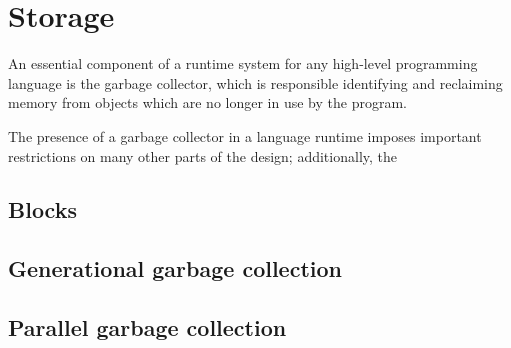 \section{Storage}

An essential component of a runtime system for any high-level
programming language is the garbage collector, which is responsible
identifying and reclaiming memory from objects which are no longer in
use by the program.

The presence of a garbage collector in a language runtime imposes
important restrictions on many other parts of the design; additionally,
the 

\subsection{Blocks}

\subsection{Generational garbage collection}

\subsection{Parallel garbage collection}


